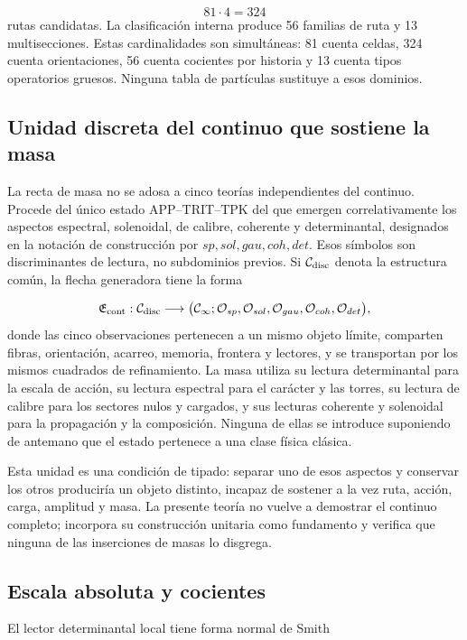 \[
81\cdot4=324
\]
rutas candidatas. La clasificación interna produce 56 familias de ruta y 13 multisecciones. Estas cardinalidades son simultáneas: 81 cuenta celdas, 324 cuenta orientaciones, 56 cuenta cocientes por historia y 13 cuenta tipos operatorios gruesos. Ninguna tabla de partículas sustituye a esos dominios.

\subsection{Unidad discreta del continuo que sostiene la masa}
La recta de masa no se adosa a cinco teorías independientes del continuo. Procede del único estado APP--TRIT--TPK del que emergen correlativamente los aspectos espectral, solenoidal, de calibre, coherente y determinantal, designados en la notación de construcción por \(sp,sol,gau,coh,det\). Esos símbolos son discriminantes de lectura, no subdominios previos. Si \(\mathcal C_{\rm disc}\) denota la estructura común, la flecha generadora tiene la forma

\[
\mathfrak E_{\rm cont}:\mathcal C_{\rm disc}
\longrightarrow
\bigl(\mathcal C_\infty;
\mathcal O_{sp},\mathcal O_{sol},\mathcal O_{gau},
\mathcal O_{coh},\mathcal O_{det}\bigr),
\]
donde las cinco observaciones pertenecen a un mismo objeto límite, comparten fibras, orientación, acarreo, memoria, frontera y lectores, y se transportan por los mismos cuadrados de refinamiento. La masa utiliza su lectura determinantal para la escala de acción, su lectura espectral para el carácter y las torres, su lectura de calibre para los sectores nulos y cargados, y sus lecturas coherente y solenoidal para la propagación y la composición. Ninguna de ellas se introduce suponiendo de antemano que el estado pertenece a una clase física clásica.

Esta unidad es una condición de tipado: separar uno de esos aspectos y conservar los otros produciría un objeto distinto, incapaz de sostener a la vez ruta, acción, carga, amplitud y masa. La presente teoría no vuelve a demostrar el continuo completo; incorpora su construcción unitaria como fundamento y verifica que ninguna de las inserciones de masas lo disgrega.

\subsection{Escala absoluta y cocientes}
El lector determinantal local tiene forma normal de Smith

